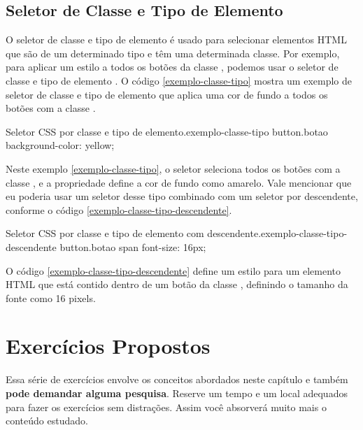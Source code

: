\subsection{Seletor de Classe e Tipo de Elemento}

O seletor de classe e tipo de elemento é usado para selecionar elementos HTML que são de um determinado tipo e têm uma determinada classe. Por exemplo, para aplicar um estilo a todos os botões da classe , podemos usar o seletor de classe e tipo de elemento . O código \ref{exemplo-classe-tipo} mostra um exemplo de seletor de classe e tipo de elemento que aplica uma cor de fundo a todos os botões com a classe .

\begin{csscode}{Seletor CSS por classe e tipo de elemento.}{exemplo-classe-tipo}
button.botao {
    background-color: yellow;
}
\end{csscode}

Neste exemplo \ref{exemplo-classe-tipo}, o seletor  seleciona todos os botões com a classe , e a propriedade  define a cor de fundo como amarelo. Vale mencionar que eu poderia usar um seletor desse tipo combinado com um seletor por descendente, conforme o código \ref{exemplo-classe-tipo-descendente}.

\begin{csscode}{Seletor CSS por classe e tipo de elemento com descendente.}{exemplo-classe-tipo-descendente}
button.botao span {
    font-size: 16px;
}
\end{csscode}

O código \ref{exemplo-classe-tipo-descendente} define um estilo para um elemento HTML  que está contido dentro de um botão da classe , definindo o tamanho da fonte como 16 pixels.

\section{Exercícios Propostos}

Essa série de exercícios envolve os conceitos abordados neste capítulo e também \textbf{pode demandar alguma pesquisa}. Reserve um tempo e um local adequados para fazer os exercícios sem distrações. Assim você absorverá muito mais o conteúdo estudado.
